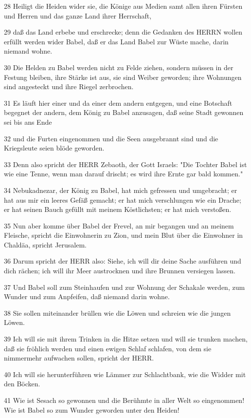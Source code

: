 \par 28 Heiligt die Heiden wider sie, die Könige aus Medien samt allen ihren Fürsten und Herren und das ganze Land ihrer Herrschaft,
\par 29 daß das Land erbebe und erschrecke; denn die Gedanken des HERRN wollen erfüllt werden wider Babel, daß er das Land Babel zur Wüste mache, darin niemand wohne.
\par 30 Die Helden zu Babel werden nicht zu Felde ziehen, sondern müssen in der Festung bleiben, ihre Stärke ist aus, sie sind Weiber geworden; ihre Wohnungen sind angesteckt und ihre Riegel zerbrochen.
\par 31 Es läuft hier einer und da einer dem andern entgegen, und eine Botschaft begegnet der andern, dem König zu Babel anzusagen, daß seine Stadt gewonnen sei bis ans Ende
\par 32 und die Furten eingenommen und die Seen ausgebrannt sind und die Kriegsleute seien blöde geworden.
\par 33 Denn also spricht der HERR Zebaoth, der Gott Israels: "Die Tochter Babel ist wie eine Tenne, wenn man darauf drischt; es wird ihre Ernte gar bald kommen."
\par 34 Nebukadnezar, der König zu Babel, hat mich gefressen und umgebracht; er hat aus mir ein leeres Gefäß gemacht; er hat mich verschlungen wie ein Drache; er hat seinen Bauch gefüllt mit meinem Köstlichsten; er hat mich verstoßen.
\par 35 Nun aber komme über Babel der Frevel, an mir begangen und an meinem Fleische, spricht die Einwohnerin zu Zion, und mein Blut über die Einwohner in Chaldäa, spricht Jerusalem.
\par 36 Darum spricht der HERR also: Siehe, ich will dir deine Sache ausführen und dich rächen; ich will ihr Meer austrocknen und ihre Brunnen versiegen lassen.
\par 37 Und Babel soll zum Steinhaufen und zur Wohnung der Schakale werden, zum Wunder und zum Anpfeifen, daß niemand darin wohne.
\par 38 Sie sollen miteinander brüllen wie die Löwen und schreien wie die jungen Löwen.
\par 39 Ich will sie mit ihrem Trinken in die Hitze setzen und will sie trunken machen, daß sie fröhlich werden und einen ewigen Schlaf schlafen, von dem sie nimmermehr aufwachen sollen, spricht der HERR.
\par 40 Ich will sie herunterführen wie Lämmer zur Schlachtbank, wie die Widder mit den Böcken.
\par 41 Wie ist Sesach so gewonnen und die Berühmte in aller Welt so eingenommen! Wie ist Babel so zum Wunder geworden unter den Heiden!
